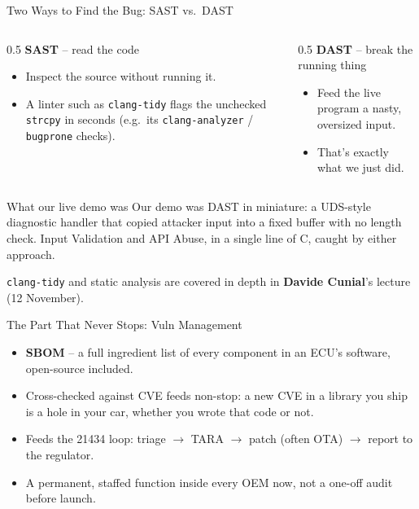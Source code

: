 \begin{frame}{Two Ways to Find the Bug: SAST vs.\ DAST}
  \begin{columns}[T]
    \begin{column}{0.5\textwidth}
      \textbf{SAST} -- read the code
      \begin{itemize}
        \item Inspect the source without running it.
        \item A linter such as \texttt{clang-tidy} flags the unchecked \texttt{strcpy} in seconds (e.g.\ its \texttt{clang-analyzer} / \texttt{bugprone} checks).
      \end{itemize}
    \end{column}
    \begin{column}{0.5\textwidth}
      \textbf{DAST} -- break the running thing
      \begin{itemize}
        \item Feed the live program a nasty, oversized input.
        \item \alert{That's exactly what we just did.}
      \end{itemize}
    \end{column}
  \end{columns}
  \vspace{0.3cm}
  \begin{alertblock}{What our live demo was}
    Our demo was DAST in miniature: a UDS-style diagnostic handler that copied attacker input into a fixed buffer with no length check. Input Validation and API Abuse, in a single line of C, caught by either approach.
  \end{alertblock}
  \vspace{0.5mm}
  {\scriptsize\color{tumgrey} \texttt{clang-tidy} and static analysis are covered in depth in \textbf{Davide Cunial}'s lecture (12 November).}
\end{frame}

\begin{frame}{The Part That Never Stops: Vuln Management}
  \begin{itemize}
    \item \textbf{SBOM} -- a full ingredient list of every component in an ECU's software, open-source included.
    \item Cross-checked against CVE feeds non-stop: a new CVE in a library you ship is a hole in your car, whether you wrote that code or not.
    \item Feeds the 21434 loop: triage $\rightarrow$ TARA $\rightarrow$ patch (often OTA) $\rightarrow$ report to the regulator.
    \item A permanent, staffed function inside every OEM now, not a one-off audit before launch.
  \end{itemize}
\end{frame}
